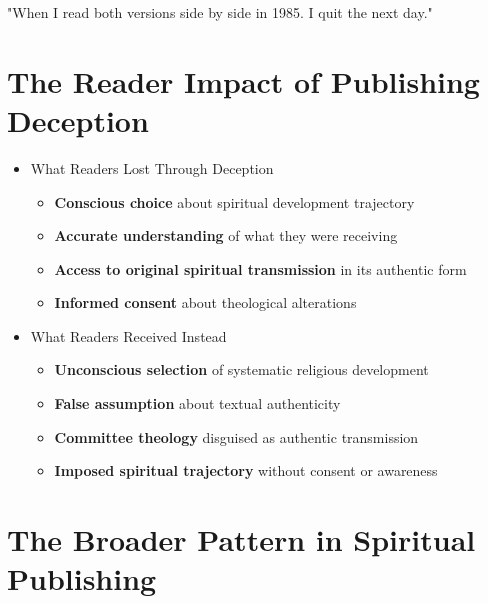 \documentclass[11pt,twoside]{book}
\begin{document}
"When I read both versions side by side in 1985. I quit the next day."
\section*{The Reader Impact of Publishing Deception}
\label{sec:org74fd795}

\begin{itemize}
\item What Readers Lost Through Deception
\label{sec:orgab981d1}
\begin{itemize}
\item \textbf{\textbf{Conscious choice}} about spiritual development trajectory
\item \textbf{\textbf{Accurate understanding}} of what they were receiving
\item \textbf{\textbf{Access to original spiritual transmission}} in its authentic form
\item \textbf{\textbf{Informed consent}} about theological alterations
\end{itemize}
\item What Readers Received Instead
\label{sec:org0600107}
\begin{itemize}
\item \textbf{\textbf{Unconscious selection}} of systematic religious development
\item \textbf{\textbf{False assumption}} about textual authenticity
\item \textbf{\textbf{Committee theology}} disguised as authentic transmission
\item \textbf{\textbf{Imposed spiritual trajectory}} without consent or awareness
\end{itemize}
\end{itemize}
\section*{The Broader Pattern in Spiritual Publishing}
\label{sec:org27a7ec5}
\end{document}
